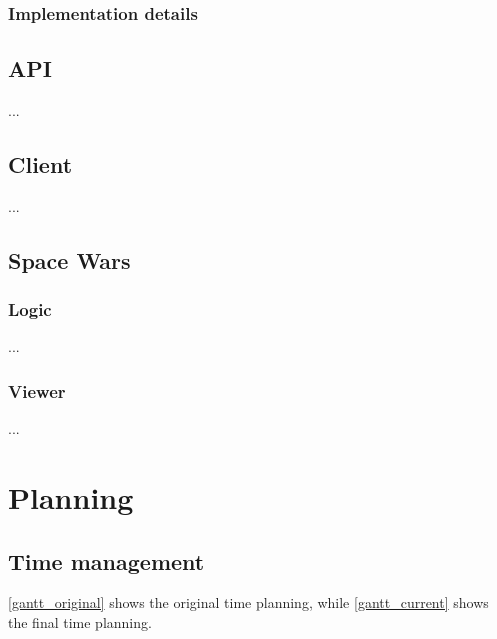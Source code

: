 \documentclass[a4paper,11pt]{article}
\begin{document}
\subsubsection{Implementation details}
\subsection{API}
...
\subsection{Client}
...
\subsection{Space Wars}
\subsubsection{Logic}
...
\subsubsection{Viewer}
...
\section{Planning}
\subsection{Time management}
\autoref{gantt_original} shows the original time planning, while \autoref{gantt_current} shows the final time
planning.
\end{document}
